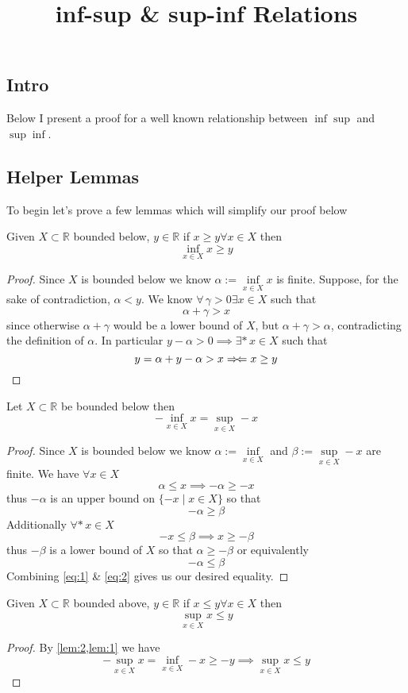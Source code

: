 \documentclass{article}
\title{inf-sup \& sup-inf Relations}
\begin{document}
\subsection{Intro} Below I present a proof for a well known relationship between $\inf\sup$ and $\sup\inf$.

\subsection{Helper Lemmas}
To begin let's prove a few lemmas which will simplify our proof below
\begin{lemma}\label{lem:1}
  Given $X \subset \mathbb{R}$ bounded below, $y \in \mathbb{R}$ if $x \ge y \forall x \in X$ then
  $$
    \inf_{x \in X} x \ge y
  $$
\end{lemma}
\begin{proof}
  Since $X$ is bounded below we know $\alpha := \inf\limits_{x \in X} x$ is finite. Suppose, for the sake of contradiction, $\alpha < y$. We know $\forall \, \gamma > 0 \exists x \in X$ such that
  $$
    \alpha + \gamma > x
  $$
  since otherwise $\alpha + \gamma$ would be a lower bound of $X$, but $\alpha + \gamma > \alpha$, contradicting the definition of $\alpha$. In particular $y - \alpha > 0 \implies \exists* \, x \in X$ such that
  $$
    y = \alpha + y - \alpha > x \Rightarrow\!\Leftarrow x \ge y
  $$
\end{proof}
\begin{lemma}\label{lem:2}
  Let $X \subset \mathbb{R}$ be bounded below then
  $$
    - \inf_{x \in X} x = \sup_{x \in X} -x
  $$
\end{lemma}
\begin{proof}
  Since $X$ is bounded below we know $\alpha := \inf\limits_{x \in X}$ and $\beta := \sup\limits_{x \in X} -x$ are finite. We have $\forall x \in X$
  $$
    \alpha \le x \implies - \alpha \ge -x
  $$
  thus $-\alpha$ is an upper bound on $\{ -x \mid x \in X \}$ so that
  \begin{equation}
    -\alpha \ge \beta \label{eq:1}
  \end{equation}
  Additionally $\forall* \, x \in X$
  $$
    -x \le \beta \implies x \ge -\beta
  $$
  thus $-\beta$ is a lower bound of $X$ so that $\alpha \ge -\beta$ or equivalently
  \begin{equation}
    -\alpha \le \beta \label{eq:2}
  \end{equation}
  Combining \eqref{eq:1} \& \eqref{eq:2} gives us our desired equality.
\end{proof}
\begin{lemma}\label{lem:3}
  Given $X \subset \mathbb{R}$ bounded above, $y \in \mathbb{R}$ if $x \le y \forall x \in X$ then
  $$
    \sup_{x \in X} x \le y
  $$
\end{lemma}
\begin{proof}
  By \cref{lem:2,lem:1} we have
  $$
    -\sup_{x \in X} x = \inf\limits_{x \in X} -x \ge -y \implies \sup_{x \in X} x \le y
  $$
\end{proof}
\end{document}
